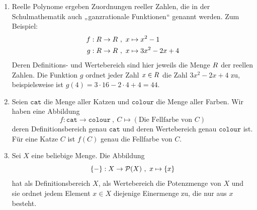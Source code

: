 \begin{bsp} \label{bsp:abbildung} \quad
    \begin{enumerate}
        \item Reelle Polynome ergeben Zuordnungen reeller Zahlen, die in der Schulmathematik auch „ganzrationale Funktionen“ genannt werden. Zum Beispiel:
        \begin{align*}
            f: \relax R \to \relax R \ & ,\ x  \mapsto x^2-1 \\
            g: \relax R \to \relax R \ & ,\  x  \mapsto 3x^2-2x+4
        \end{align*}
        Deren Definitions- und Wertebereich sind hier jeweils die Menge $\relax R$ der reellen Zahlen. Die Funktion $g$ ordnet jeder Zahl $x\in\relax R$ die Zahl $3x^2-2x+4$ zu, beispielsweise ist $g(4) = 3\cdot 16 - 2\cdot 4 + 4 = 44$.

        \item Seien $\mathtt{cat}$ die Menge aller Katzen und $\mathtt{colour}$ die Menge aller Farben. Wir haben eine Abbildung
            \[ f: \mathtt{cat} \to \mathtt{colour} \ ,\ C \mapsto (\text{Die Fellfarbe von $C$}) \]
        deren Definitionsbereich genau $\mathtt{cat}$ und deren Wertebereich genau $\mathtt{colour}$ ist. Für eine Katze $C$ ist $f(C)$ genau die Fellfarbe von $C$.
        \item Sei $X$ eine beliebige Menge. Die Abbildung
            \[ \{-\}: X \to \mathcal P(X) \ ,\ x \mapsto \{x\} \]
        hat als Definitionsbereich $X$, als Wertebereich die Potenzmenge von $X$ und sie ordnet jedem Element $x \in X$ diejenige Einermenge zu, die nur aus $x$ besteht.


\end{enumerate}
\end{bsp}
